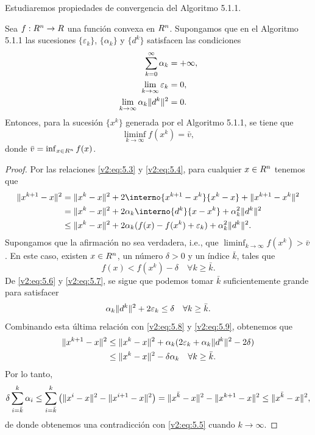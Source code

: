 Estudiaremos propiedades de convergencia del Algoritmo 5.1.1.

\begin{theorem}\label{v2:thm:5.1.1}
    Sea $f : R^n \to R$ una función convexa en $R^n$. Supongamos que en el Algoritmo 5.1.1 las sucesiones $\{\varepsilon_k\}$, $\{\alpha_k\}$ y $\{d^k\}$ satisfacen las condiciones
    \begin{align}
        \sum_{k=0}^\infty \alpha_k &= +\infty, \label{v2:eq:5.5} \\
        \lim_{k \to \infty} \varepsilon_k &= 0, \label{v2:eq:5.6} \\
        \lim_{k \to \infty} \alpha_k \lVert d^k\rVert^2 &= 0. \label{v2:eq:5.7}
    \end{align}
    Entonces, para la sucesión $\{x^k\}$ generada por el Algoritmo 5.1.1, se tiene que
    \[
        \liminf_{k \to \infty} f(x^k) = \bar{v},
    \]
    donde $\bar{v} = \inf_{x \in R^n} f(x)$.
\end{theorem}

\begin{proof}
    Por las relaciones \eqref{v2:eq:5.3} y \eqref{v2:eq:5.4}, para cualquier $x \in R^n$ tenemos que
    \begin{align}
        \norm{x^{k+1} - x}^2 &= \norm{x^k - x}^2 + 2\interno{x^{k+1} - x^k}{x^k - x} + \norm{x^{k+1} - x^k}^2 \nonumber \\
        &= \norm{x^k - x}^2 + 2\alpha_k \interno{d^k}{x - x^k} + \alpha_k^2 \norm{d^k}^2 \nonumber \\
        &\le \norm{x^k - x}^2 + 2\alpha_k (f(x) - f(x^k) + \varepsilon_k) + \alpha_k^2 \norm{d^k}^2. \label{v2:eq:5.8}
    \end{align}
    Supongamos que la afirmación no sea verdadera, i.e., que $\liminf_{k \to \infty} f(x^k) > \bar{v}$. En este caso, existen $x \in R^n$, un número $\delta > 0$ y un índice $\bar{k}$, tales que
    \begin{equation}
        f(x) < f(x^k) - \delta \quad \forall k \ge \bar{k}.
        \label{v2:eq:5.9}
    \end{equation}
    De \eqref{v2:eq:5.6} y \eqref{v2:eq:5.7}, se sigue que podemos tomar $\bar{k}$ suficientemente grande para satisfacer
    \[
        \alpha_k \lVert d^k\rVert^2 + 2\varepsilon_k \le \delta \quad \forall k \ge \bar{k}.
    \]
    Combinando esta última relación con \eqref{v2:eq:5.8} y \eqref{v2:eq:5.9}, obtenemos que
    \begin{align*}
        \lVert x^{k+1} - x\rVert^2 &\le \lVert x^k - x\rVert^2 + \alpha_k(2\varepsilon_k + \alpha_k \lVert d^k\rVert^2 - 2\delta) \\
        &\le \lVert x^k - x\rVert^2 - \delta \alpha_k \quad \forall k \ge \bar{k}.
    \end{align*}
    Por lo tanto,
    \[
        \delta \sum_{i=\bar{k}}^k \alpha_i \le \sum_{i=\bar{k}}^k \left( \lVert x^i - x\rVert^2 - \lVert x^{i+1} - x\rVert^2 \right) = \lVert x^{\bar{k}} - x\rVert^2 - \lVert x^{k+1} - x\rVert^2 \le \lVert x^{\bar{k}} - x\rVert^2,
    \]
    de donde obtenemos una contradicción con \eqref{v2:eq:5.5} cuando $k \to \infty$.
\end{proof}

